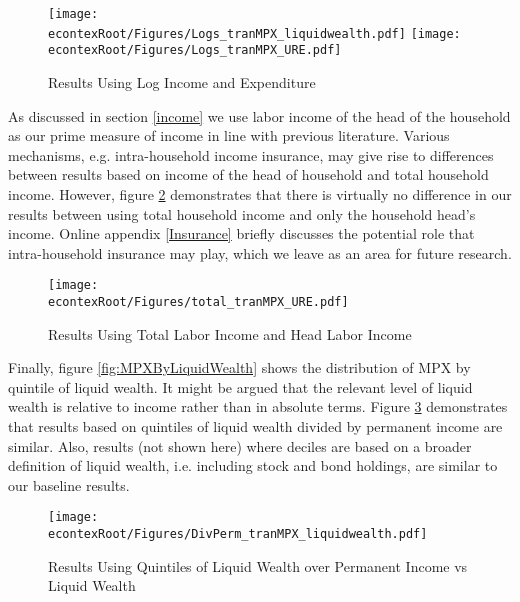 \documentclass[titlepage]{\econtex}\newcommand{\texname}{ConsumptionHeterogeneity}
\begin{document}
\begin{figure} 
	\begin{centering}
		\texttt{[image: \\econtexRoot/Figures/Logs\_tranMPX\_liquidwealth.pdf]}
		\texttt{[image: \\econtexRoot/Figures/Logs\_tranMPX\_URE.pdf]}
		\caption{Results Using Log Income and Expenditure}
		\label{fig:Robust_Logs}
	\end{centering}
\end{figure}

As discussed in section \ref{income} we use labor income of the head of the household as our prime measure of income in line with previous literature. Various mechanisms, e.g. intra-household income insurance, may give rise to differences between results based on income of the head of household and total household income. However, figure \ref{fig:Robust_TotalvsHead} demonstrates that there is virtually no difference in our results between using total household income and only the household head's income. Online appendix \ref{Insurance} briefly discusses the potential role that intra-household insurance may play, which we leave as an area for future research. 

\begin{figure} 
	\begin{centering}
		\texttt{[image: \\econtexRoot/Figures/total\_tranMPX\_URE.pdf]}
		\caption{Results Using Total Labor Income and Head Labor Income}
		\label{fig:Robust_TotalvsHead}
	\end{centering}
\end{figure}

Finally, figure \ref{fig:MPXByLiquidWealth} shows the distribution of MPX by quintile of liquid wealth. It might be argued that the relevant level of liquid wealth is relative to income rather than in absolute terms. Figure \ref{fig:Robust_DivPerm} demonstrates that results based on quintiles of liquid wealth divided by permanent income are similar. Also, results (not shown here) where deciles are based on a broader definition of liquid wealth, i.e. including stock and bond holdings, are similar to our baseline results. 

\begin{figure} 
	\begin{centering}
		\texttt{[image: \\econtexRoot/Figures/DivPerm\_tranMPX\_liquidwealth.pdf]}
		\caption{Results Using Quintiles of Liquid Wealth over Permanent Income vs Liquid Wealth}
		\label{fig:Robust_DivPerm}
	\end{centering}
\end{figure}
\end{document}
